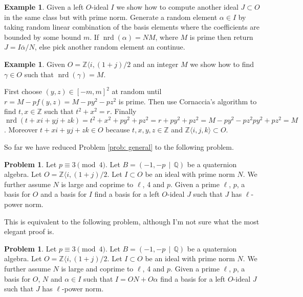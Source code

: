 \documentclass[10pt]{article}
\theoremstyle{plain}
\theoremstyle{definition}
\newtheorem{example}[theorem]{Example}
\newtheorem{problem}[theorem]{Problem}
\newcommand{\op}{\operatorname}
\newcommand{\Z}{\mathbb{Z}}
\newcommand{\Q}{\mathbb{Q}}
\newcommand{\nrd}{\op{nrd}}
\begin{document}
\begin{example}
    Given a left \( O \)-ideal \( I \) we show how to compute another ideal \( J \subset O \) in the same class but with prime norm.
    Generate a random element \( \alpha \in I \) by taking random linear combination of the basis elements where the coefficients are bounded by some bound \( m \).
    If \( \nrd(\alpha) = NM \), where \( M \) is prime then return \( J = I \overline{\alpha} / N \), else pick another random element an continue.
\end{example}


\begin{example}
    Given \( O = \Z \langle i, (1+j) / 2 \) and an integer \( M \) we show how to find \( \gamma \in O \) such that \( \nrd(\gamma) = M \).

    First choose \( (y, z) \in [-m , m]^2 \) at random until \( r = M - pf(y, z) = M - py^2 - pz^2\) is prime.
    Then use Cornaccia's algorithm to find \( t, x \in \Z \) such that \(  t^2 + x^2 = r.\)
    Finally \( \nrd(t + xi + yj + zk) = t^2 + x^2 + py^2 + pz^2 = r + py^2 + pz^2 = M - py^2 - pz^2 py^2 + pz^2 = M\).
    Moreover \( t + xi + yj + zk \in O \) because \( t, x, y, z \in \Z \) and \( \Z \langle i ,j, k \rangle \subset O \).
\end{example}


So far we have reduced Problem \ref{prob: general} to the following problem.
\begin{problem} \label{prob: prime norm}
Let \( p \equiv 3 \pmod{4} \).
Let \( B =  (-1, -p \, \mid \, \Q) \) be a quaternion algebra.
Let \( O = \Z \langle i, (1+j) / 2 \).
Let \( I \subset O \) be an ideal with prime norm \( N \).
We further assume \( N \) is large and coprime to \( \ell \), 4 and \( p \).
Given a prime \( \ell \), \( p \), a basis for \( O \) and a basis for \( I \) find a basis for a left \( O \)-ideal \( J \) such that \( J \) has \( \ell \)-power norm.
\end{problem}

This is equivalent to the following problem, although I'm not sure what the most elegant proof is.
\begin{problem} \label{prob: prime norm}
Let \( p \equiv 3 \pmod{4} \).
Let \( B =  (-1, -p \, \mid \, \Q) \) be a quaternion algebra.
Let \( O = \Z \langle i, (1+j) / 2 \).
Let \( I \subset O \) be an ideal with prime norm \( N \).
We further assume \( N \) is large and coprime to \( \ell \), 4 and \( p \).
Given a prime \( \ell \), \( p \), a basis for \( O \), \( N \) and \( \alpha \in I \) such that \( I = ON + O\alpha \) find a basis for a left \( O \)-ideal \( J \) such that \( J \) has \( \ell \)-power norm.
\end{problem}
\end{document}
